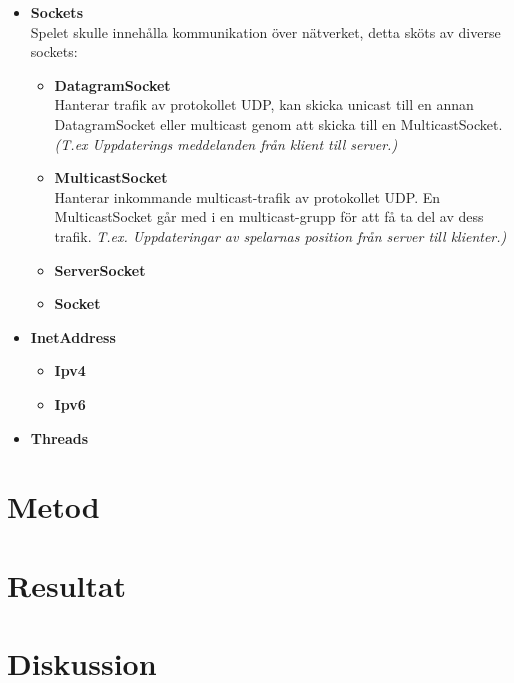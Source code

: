 \documentclass[10pt, titlepage, oneside, a4paper]{article}
\begin{document}
        \begin{itemize}
            \item \textbf{Sockets} \\
            Spelet skulle innehålla kommunikation över nätverket, detta sköts av diverse sockets:
            	\begin{itemize}
            		\item \textbf{DatagramSocket} \\Hanterar trafik av protokollet UDP, kan skicka unicast till en annan DatagramSocket eller multicast genom att skicka till en MulticastSocket. \textit{(T.ex Uppdaterings meddelanden från klient till server.)}
            		
            		\item \textbf{MulticastSocket} \\Hanterar inkommande multicast-trafik av protokollet UDP. En MulticastSocket går med i en multicast-grupp för att få ta del av dess trafik. \textit{T.ex. Uppdateringar av spelarnas position från server till klienter.)}
            		\item \textbf{ServerSocket}
            		\item \textbf{Socket}
            	\end{itemize}
            
            \item \textbf{InetAddress}
            	\begin{itemize}
            		\item \textbf{Ipv4}
            		\item \textbf{Ipv6}
            	\end{itemize}
            	
			\item \textbf{Threads}            
        \end{itemize}
	\section{Metod}
	\section{Resultat}
	\section{Diskussion}
    
    
\end{document}
